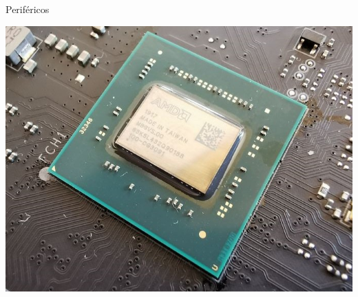 \documentclass[10pt,xcolor={dvipsnames}]{beamer}
\begin{document}
\begin{frame}{Periféricos}
\begin{center}
\includegraphics[scale=0.5]{Figures/PCH}
\end{center}
\end{frame}
\end{document}
